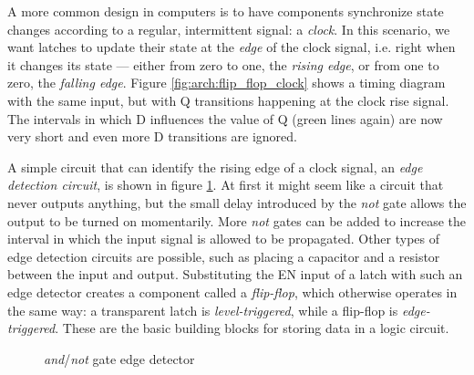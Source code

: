 A more common design in computers is to have components synchronize state
changes according to a regular, intermittent signal: a \textit{clock}.  In this
scenario, we want latches to update their state at the \emph{edge} of the clock
signal, i.e. right when it changes its state --- either from zero to one, the
\textit{rising edge}, or from one to zero, the \textit{falling edge}.  Figure
\ref{fig:arch:flip_flop_clock} shows a timing diagram with the same input, but
with Q transitions happening at the clock rise signal.  The intervals in which D
influences the value of Q (green lines again) are now very short and even more D
transitions are ignored.

A simple circuit that can identify the rising edge of a clock signal, an
\textit{edge detection circuit}, is shown in figure \ref{fig:arch:edge_detect}.
At first it might seem like a circuit that never outputs anything, but the small
delay introduced by the \textit{not} gate allows the output to be turned on
momentarily.  More \textit{not} gates can be added to increase the interval in
which the input signal is allowed to be propagated.  Other types of edge
detection circuits are possible, such as placing a capacitor and a resistor
between the input and output.  Substituting the EN input of a latch with such an
edge detector creates a component called a \textit{flip-flop}, which otherwise
operates in the same way: a transparent latch is \textit{level-triggered}, while
a flip-flop is \textit{edge-triggered}.  These are the basic building blocks for
storing data in a logic circuit.

\begin{figure}[ht]
    \centering
    \caption{\textit{and}/\textit{not} gate edge detector}
    \label{fig:arch:edge_detect}
\end{figure}
